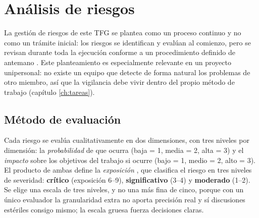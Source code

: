
\chapter{Análisis de riesgos}
\label{ch:riesgos}

La gestión de riesgos de este \ac{TFG} se plantea como un proceso continuo y no como un trámite inicial: los riesgos se identifican y evalúan al comienzo, pero se revisan durante toda la ejecución conforme a un procedimiento definido de antemano \parencite{boehm-risk}.
Este planteamiento es especialmente relevante en un proyecto unipersonal: no existe un equipo que detecte de forma natural los problemas de otro miembro, así que la vigilancia debe vivir dentro del propio método de trabajo (capítulo \ref{ch:tareas}).

\section{Método de evaluación}
\label{sec:riesgos-metodo}

Cada riesgo se evalúa cualitativamente en dos dimensiones, con tres niveles por dimensión: la \emph{probabilidad} de que ocurra (baja = 1, media = 2, alta = 3) y el \emph{impacto} sobre los objetivos del trabajo si ocurre (bajo = 1, medio = 2, alto = 3).
El producto de ambas define la \emph{exposición} \parencite{boehm-risk}, que clasifica el riesgo en tres niveles de severidad: \textbf{crítico} (exposición 6--9), \textbf{significativo} (3--4) y \textbf{moderado} (1--2).
Se elige una escala de tres niveles, y no una más fina de cinco, porque con un único evaluador la granularidad extra no aporta precisión real y sí discusiones estériles consigo mismo; la escala gruesa fuerza decisiones claras.

